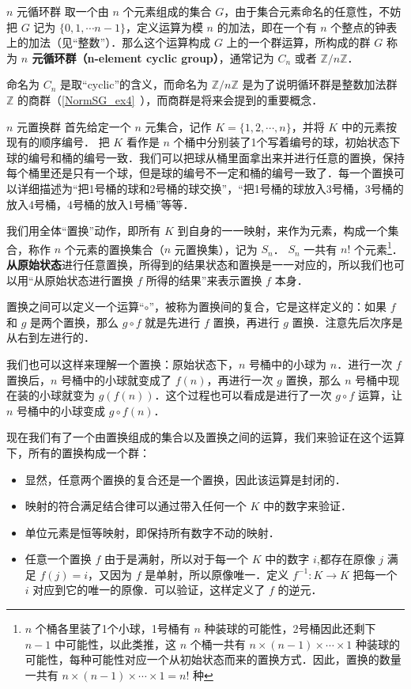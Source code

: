 \begin{example}{$n$ 元循环群}\label{Group_ex2}
取一个由 $n$ 个元素组成的集合 $G$，由于集合元素命名的任意性，不妨把 $G$ 记为 $\{0, 1, \cdots n-1\}$，定义运算为模 $n$ 的加法，即在一个有 $n$ 个整点的钟表上的加法（见“整数”）．那么这个运算构成 $G$ 上的一个群运算，所构成的群 $G$ 称为 \textbf{$n$ 元\textbf{循环群（n-element cyclic group）}}，通常记为 $C_n$ 或者 $\mathbb{Z}/n\mathbb{Z}$．

命名为 $C_n$ 是取“cyclic”的含义，而命名为 $\mathbb{Z}/n\mathbb{Z}$ 是为了说明循环群是整数加法群 $\mathbb{Z}$ 的商群（\autoref{NormSG_ex4}~），而商群是将来会提到的重要概念．
\end{example}

\begin{example}{$n$ 元置换群}\label{Group_ex3}
首先给定一个 $n$ 元集合，记作 $K=\{1,2, \cdots, n\}$，并将 $K$ 中的元素按现有的顺序编号． 把 $K$ 看作是 $n$ 个桶中分别装了1个写着编号的球，初始状态下球的编号和桶的编号一致．我们可以把球从桶里面拿出来并进行任意的置换，保持每个桶里还是只有一个球，但是球的编号不一定和桶的编号一致了．每一个置换可以详细描述为“把1号桶的球和2号桶的球交换”，“把1号桶的球放入3号桶，3号桶的放入4号桶，4号桶的放入1号桶”等等．

我们用全体“置换”动作，即所有 $K$ 到自身的一一映射，来作为元素，构成一个集合，称作 $n$ 个元素的置换集合（$n$ 元置换集），记为 $S_n$． $S_n$ 一共有 $n!$ 个元素\footnote{$n$ 个桶各里装了1个小球，1号桶有 $n$ 种装球的可能性，2号桶因此还剩下 $n-1$ 中可能性，以此类推，这 $n$ 个桶一共有 $n\times(n-1)\times\cdots\times1$ 种装球的可能性，每种可能性对应一个从初始状态而来的置换方式．因此，置换的数量一共有 $n\times(n-1)\times\cdots\times1=n!$ 种}． \textbf{从原始状态}进行任意置换，所得到的结果状态和置换是一一对应的，所以我们也可以用“从原始状态进行置换 $f$ 所得的结果”来表示置换 $f$ 本身．

置换之间可以定义一个运算“$\circ$”，被称为置换间的复合，它是这样定义的：如果 $f$ 和 $g$ 是两个置换，那么 $g\circ f$ 就是先进行 $f$ 置换，再进行 $g$ 置换．注意先后次序是从右到左进行的．

我们也可以这样来理解一个置换：原始状态下，$n$ 号桶中的小球为 $n$．进行一次 $f$ 置换后，$n$ 号桶中的小球就变成了 $f(n)$，再进行一次 $g$ 置换，那么 $n$ 号桶中现在装的小球就变为 $g(f(n))$．这个过程也可以看成是进行了一次 $g\circ f$ 运算，让 $n$ 号桶中的小球变成 $g\circ f(n)$．

现在我们有了一个由置换组成的集合以及置换之间的运算，我们来验证在这个运算下，所有的置换构成一个群：
\begin{itemize}
\item 显然，任意两个置换的复合还是一个置换，因此该运算是封闭的．
\item 映射的符合满足结合律可以通过带入任何一个 $K$ 中的数字来验证．
\item 单位元素是恒等映射，即保持所有数字不动的映射．
\item 任意一个置换 $f$ 由于是满射，所以对于每一个 $K$ 中的数字 $i$,都存在原像 $j$ 满足 $f(j)=i$，又因为 $f$ 是单射，所以原像唯一．定义 $f^{-1}:K\rightarrow K$ 把每一个 $i$ 对应到它的唯一的原像．可以验证，这样定义了 $f$ 的逆元．
\end{itemize}


\end{example}

